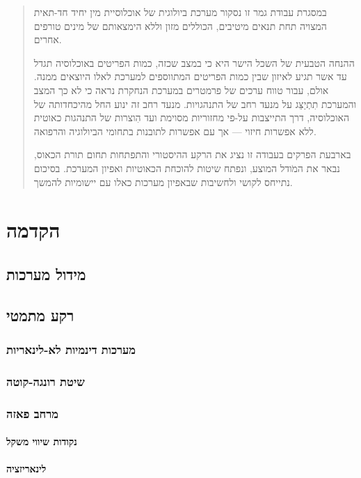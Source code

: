\documentclass{article}
\begin{document}
\begin{abstract}
\noindent במסגרת עבודת גמר זו נסקור מערכת ביולוגית של אוכלוסיית מין
יחיד חד-תאית המצויה תחת תנאים מיטיבים, הכוללים מזון וללא הימצאותם
של מינים טורפים אחרים.\bigskip
\par\noindent ההנחה הטבעית של השכל הישר היא כי במצב שכזה, כמות הפריטים באוכלוסיה
תגדל עד אשר תגיע לאיזון שבין כמות הפריטים המתווספים למערכת לאלו היוצאים
ממנה. אולם, עבור טווח ערכים של פרמטרים במערכת הנחקרת נראה כי לא כך
המצב והמערכת תִתְיַצֵּג על מנעד רחב של התנהגויות.\newline
מנעד רחב זה ינוע החל מהיכחדותה של האוכלוסיה, דרך התייצבות על-פי מחזוריות
מסוימת ועד הִוצרות של התנהגות כאוטית ללא אפשרות חיזוי — אך עם אפשרות
לתובנות בתחומי הביולוגיה והרפואה.\bigskip
\par\noindent בארבעת הפרקים בעבודה זו נציג את הרקע ההיסטורי והתפתחות תחום
תורת הכאוס, נבאר את המֹודל המוצע, ונפתח שיטות להוכחת הכאוטיות ואפיון
המערכת. בסיכום נתייחס לקושי ולחשיבות שבאפיון מערכות כאלו עם יישומיות
להמשך.
\end{abstract}
\setcounter{page}{1}
\newpage
\tableofcontents
\newpage
\listoffigures
\listofalgorithms
\newpage

\setcounter{page}{1}
\section{הקדמה}
\subsection{מידול מערכות}
\subsection{רקע מתמטי}
\subsubsection{מערכות דינמיות לא-לינאריות}
\subsubsection{שיטת רונגה-קוטה}
\subsubsection{מרחב פאזה}
\paragraph{נקודות שיווי משקל}
\paragraph{לינאריזציה}
\end{document}
